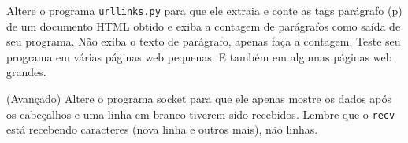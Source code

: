 \begin{ex}
Altere o programa {\tt urllinks.py} para que ele extraia e conte 
as tags parágrafo (p) de um documento HTML obtido e exiba a contagem
de parágrafos como saída de seu programa.  
Não exiba o texto de parágrafo, apenas faça a contagem.
Teste seu programa em várias páginas web pequenas. E também em algumas
páginas web grandes.
\end{ex}

\begin{ex}
(Avançado) Altere o programa socket para que ele apenas mostre os dados
após os cabeçalhos e uma linha em branco tiverem sido recebidos. Lembre 
que o {\tt recv} está recebendo caracteres (nova linha e outros mais),
não linhas.
\end{ex}
